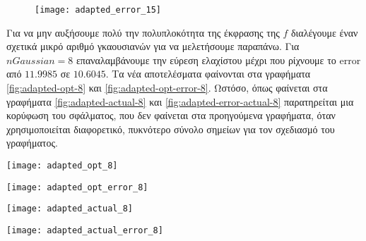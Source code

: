 \begin{figure}[bh]
	\centerfloat
	\texttt{[image: adapted\_error\_15]}
	\label{fig:adapted-error-15}
\end{figure}

\hfill \break
Για να μην αυξήσουμε πολύ την πολυπλοκότητα της έκφρασης της $f$ διαλέγουμε έναν σχετικά μικρό αριθμό γκαουσιανών για να μελετήσουμε παραπάνω. 
Για $nGaussian = 8$ επαναλαμβάνουμε την εύρεση ελαχίστου μέχρι που ρίχνουμε το error από $11.9985$ σε $10.6045$. 
Τα νέα αποτελέσματα φαίνονται στα γραφήματα \ref{fig:adapted-opt-8} και \ref{fig:adapted-opt-error-8}. 
Ωστόσο, όπως φαίνεται στα γραφήματα \ref{fig:adapted-actual-8} και \ref{fig:adapted-error-actual-8} παρατηρείται μια κορύφωση του σφάλματος, 
που δεν φαίνεται στα προηγούμενα γραφήματα, 
όταν χρησιμοποιείται διαφορετικό, πυκνότερο σύνολο σημείων για τον σχεδιασμό του γραφήματος.

\begin{multicols}{2}

\begin{Figure}
	\centerfloat
	\texttt{[image: adapted\_opt\_8]}
	\label{fig:adapted-opt-8}
\end{Figure}

\begin{Figure}
	\centerfloat
	\texttt{[image: adapted\_opt\_error\_8]}
	\label{fig:adapted-opt-error-8}
\end{Figure}

\begin{Figure}
	\centerfloat
	\texttt{[image: adapted\_actual\_8]}
	\label{fig:adapted-actual-8}
\end{Figure}

\begin{Figure}
	\centerfloat
	\texttt{[image: adapted\_actual\_error\_8]}
	\label{fig:adapted-error-actual-8}
\end{Figure}

\end{multicols}
